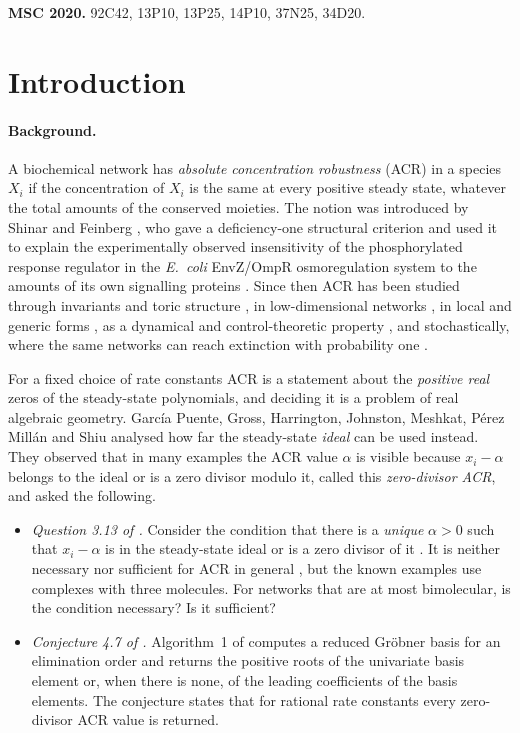\documentclass[11pt,a4paper]{article}
\theoremstyle{plain}
\theoremstyle{definition}
\theoremstyle{remark}
\begin{document}
\noindent\textbf{MSC 2020.} 92C42, 13P10, 13P25, 14P10, 37N25, 34D20.

\section{Introduction}\label{sec:intro}

\paragraph{Background.}
A biochemical network has \emph{absolute concentration robustness} (ACR) in a species $X_i$ if the concentration of $X_i$ is the same at every positive steady state, whatever the total amounts of the conserved moieties. The notion was introduced by Shinar and Feinberg \cite{shinarfeinberg}, who gave a deficiency-one structural criterion and used it to explain the experimentally observed insensitivity of the phosphorylated response regulator in the \emph{E.~coli} EnvZ/OmpR osmoregulation system to the amounts of its own signalling proteins \cite{batchelor,shinaralon}. Since then ACR has been studied through invariants and toric structure \cite{karp,toric}, in low-dimensional networks \cite{lowdim}, in local and generic forms \cite{localglobal,generic}, as a dynamical and control-theoretic property \cite{dynamic,integral}, and stochastically, where the same networks can reach extinction with probability one \cite{aej}.

For a fixed choice of rate constants ACR is a statement about the \emph{positive real} zeros of the steady-state polynomials, and deciding it is a problem of real algebraic geometry. Garc\'ia Puente, Gross, Harrington, Johnston, Meshkat, P\'erez Mill\'an and Shiu \cite{acr} analysed how far the steady-state \emph{ideal} can be used instead. They observed that in many examples the ACR value $\alpha$ is visible because $x_i-\alpha$ belongs to the ideal or is a zero divisor modulo it, called this \emph{zero-divisor ACR}, and asked the following.
\begin{itemize}
\item \emph{Question 3.13 of \cite{acr}.} Consider the condition that there is a \emph{unique} $\alpha>0$ such that $x_i-\alpha$ is in the steady-state ideal or is a zero divisor of it \cite[condition (13)]{acr}. It is neither necessary nor sufficient for ACR in general \cite[Examples 3.11 and 3.12]{acr}, but the known examples use complexes with three molecules. For networks that are at most bimolecular, is the condition necessary? Is it sufficient?
\item \emph{Conjecture 4.7 of \cite{acr}.} Algorithm~1 of \cite{acr} computes a reduced Gr\"obner basis for an elimination order and returns the positive roots of the univariate basis element or, when there is none, of the leading coefficients of the basis elements. The conjecture states that for rational rate constants every zero-divisor ACR value is returned.
\end{itemize}
\end{document}
